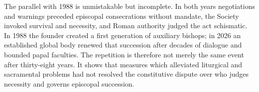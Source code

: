 The parallel with 1988 is unmistakable but incomplete. In both years negotiations and warnings preceded episcopal consecrations without mandate, the Society invoked survival and necessity, and Roman authority judged the act schismatic. In 1988 the founder created a first generation of auxiliary bishops; in 2026 an established global body renewed that succession after decades of dialogue and bounded papal faculties. The repetition is therefore not merely the same event after thirty-eight years. It shows that measures which alleviated liturgical and sacramental problems had not resolved the constitutive dispute over who judges necessity and governs episcopal succession.
